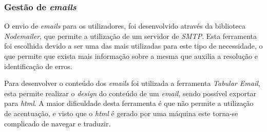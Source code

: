 \subsubsection{Gestão de \textit{emails}}
O envio de \textit{emails} para os utilizadores, foi desenvolvido através da biblioteca \textit{Nodemailer}, que permite a utilização de um servidor de \textit{SMTP}. Esta ferramenta foi escolhida devido a ser uma das mais utilizadas para este tipo de necessidade, o que permite que exista mais informação sobre a mesma que auxilia a resolução e identificação de erros. 

Para desenvolver o conteúdo dos \textit{emails} foi utilizada a ferramenta \textit{Tabular Email}, esta permite realizar o \textit{design} do conteúdo de um \textit{email}, sendo possível exportar para \textit{html}. A maior dificuldade desta ferramenta é que não permite a utilização de acentuação, e visto que o \textit{html} é gerado por uma máquina este torna-se complicado de navegar e traduzir.